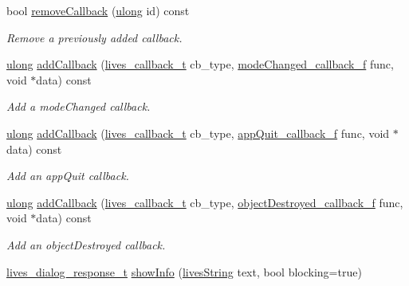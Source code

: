 \begin{DoxyCompactItemize}
\item 
bool \hyperlink{classlives_1_1livesApp_a01bcbe01f1c32ee413286d3d6fae06e6}{remove\-Callback} (\hyperlink{liblives_8hpp_a718b4eb2652c286f4d42dc18a8e71a1a}{ulong} id) const 
\begin{DoxyCompactList}\small\item\em Remove a previously added callback. \end{DoxyCompactList}\item 
\hyperlink{liblives_8hpp_a718b4eb2652c286f4d42dc18a8e71a1a}{ulong} \hyperlink{classlives_1_1livesApp_abe082e5bbe4e9634613e4dcf5f70141b}{add\-Callback} (\hyperlink{liblives_8hpp_a61f9a031360f0a0280151f44695c2519}{lives\-\_\-callback\-\_\-t} cb\-\_\-type, \hyperlink{namespacelives_a3f53f9a55851d8980f02ddc790b12720}{mode\-Changed\-\_\-callback\-\_\-f} func, void $\ast$data) const 
\begin{DoxyCompactList}\small\item\em Add a mode\-Changed callback. \end{DoxyCompactList}\item 
\hyperlink{liblives_8hpp_a718b4eb2652c286f4d42dc18a8e71a1a}{ulong} \hyperlink{classlives_1_1livesApp_aaaac0fb32462c2cc0602970dc3393475}{add\-Callback} (\hyperlink{liblives_8hpp_a61f9a031360f0a0280151f44695c2519}{lives\-\_\-callback\-\_\-t} cb\-\_\-type, \hyperlink{namespacelives_a097f122e1e32156c1acc94f8987d3384}{app\-Quit\-\_\-callback\-\_\-f} func, void $\ast$data) const 
\begin{DoxyCompactList}\small\item\em Add an app\-Quit callback. \end{DoxyCompactList}\item 
\hyperlink{liblives_8hpp_a718b4eb2652c286f4d42dc18a8e71a1a}{ulong} \hyperlink{classlives_1_1livesApp_a0290233534150e8729a0eddf2e53ac92}{add\-Callback} (\hyperlink{liblives_8hpp_a61f9a031360f0a0280151f44695c2519}{lives\-\_\-callback\-\_\-t} cb\-\_\-type, \hyperlink{namespacelives_af2316179e783c96b4c146713929726f7}{object\-Destroyed\-\_\-callback\-\_\-f} func, void $\ast$data) const 
\begin{DoxyCompactList}\small\item\em Add an object\-Destroyed callback. \end{DoxyCompactList}\item 
\hyperlink{liblives_8hpp_afc1c16ade7ad25b77f9e301e6091f7d8}{lives\-\_\-dialog\-\_\-response\-\_\-t} \hyperlink{classlives_1_1livesApp_a7dd848165caf44df1d89feaab3eb7415}{show\-Info} (\hyperlink{classlives_1_1livesString}{lives\-String} text, bool blocking=true)

\end{DoxyCompactItemize}
